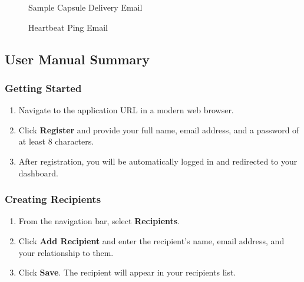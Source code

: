\documentclass[12pt, a4paper]{article}
\begin{document}
\begin{appendices}
\begin{figure}[H]
  \centering
  \caption{Sample Capsule Delivery Email}
  \label{fig:delivery_email}
\end{figure}

\begin{figure}[H]
  \centering
  \caption{Heartbeat Ping Email}
  \label{fig:heartbeat_email}
\end{figure}

\subsection{User Manual Summary}

\subsubsection{Getting Started}

\begin{enumerate}
  \item Navigate to the application URL in a modern web browser.
  \item Click \textbf{Register} and provide your full name, email address, and a password of at least 8 characters.
  \item After registration, you will be automatically logged in and redirected to your dashboard.
\end{enumerate}

\subsubsection{Creating Recipients}

\begin{enumerate}
  \item From the navigation bar, select \textbf{Recipients}.
  \item Click \textbf{Add Recipient} and enter the recipient's name, email address, and your relationship to them.
  \item Click \textbf{Save}. The recipient will appear in your recipients list.
\end{enumerate}


\end{appendices}
\end{document}
